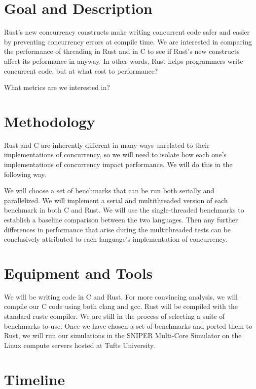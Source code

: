 \documentclass{article}
\begin{document}
\section*{Goal and Description}

Rust's new concurrency constructs make writing concurrent code safer and easier by preventing concurrency errors at compile time. We are interested in comparing the performance of threading in Rust and in C to see if Rust's new constructs affect its peformance in anyway. In other words, Rust helps programmers write concurrent code, but at what cost to performance?

What metrics are we interested in?


\section*{Methodology}

Rust and C are inherently different in many ways unrelated to their implementations of concurrency, so we will need to isolate how each one's implementations of concurrency impact performance. We will do this in the following way.

We will choose a set of benchmarks that can be run both serially and parallelized. We will implement a serial and multithreaded version of each benchmark in both C and Rust. We will use the single-threaded benchmarks to
establish a baseline comparison between the two languages. Then any further differences in performance that arise during the multithreaded tests can be conclusively attributed to each language's implementation of concurrency.


\section*{Equipment and Tools}

We will be writing code in C and Rust. For more convincing analysis, we will compile our C code using both clang and gcc. Rust will be compiled with the standard rustc compiler. We are still in the process of selecting a suite of benchmarks to use. Once we have chosen a set of benchmarks and ported them to Rust, we will run our simulations in the SNIPER Multi-Core Simulator \cite{Sniper} on the Linux compute servers hosted at Tufts University.


\section*{Timeline}





\end{document}

